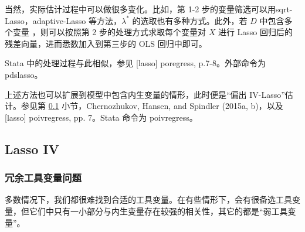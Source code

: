 { \def\FigName{Fig-lasso-poreg-01}
%	
%		
%		




当然，实际估计过程中可以做很多变化。比如，第 1-2 步的变量筛选可以用sqrt-Lasso，adaptive-Lasso 等方法，$\lambda^*$ 的选取也有多种方式。此外，若 $D$ 中包含多个变量%
，则可以按照第 2 步的处理方式求取每个变量对 $X$ 进行 Lasso 回归后的残差向量，进而悉数加入到第三步的 OLS 回归中即可。

Stata 中的处理过程与此相似，参见 [lasso] poregress, p.7-8。外部命令为 pdslasso。

上述方法也可以扩展到模型中包含内生变量的情形，此时便是“偏出 IV-Lasso”估计。参见第 \ref{sec:lasso-IV} 小节，Chernozhukov, Hansen, and Spindler (2015a, b)，以及 [lasso] poivregress, pp. 7。Stata 命令为 poivregress。 









\subsection{Lasso IV}\label{sec:lasso-IV}

\subsubsection{冗余工具变量问题}
多数情况下，我们都很难找到合适的工具变量。在有些情形下，会有很备选工具变量，但它们中只有一小部分与内生变量存在较强的相关性，其它的都是“弱工具变量”。

}
